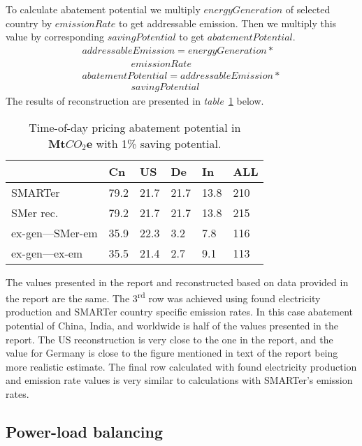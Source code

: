 \documentclass[11pt, twocolumn]{article}
\newcommand{\ts}{\textsuperscript}
\begin{document}
To calculate abatement potential we multiply $energyGeneration$ of selected country by $emissionRate$ to get addressable emission. Then we multiply this value by corresponding $savingPotential$ to get $abatementPotential$.
\begin{gather*}
  addressableEmission = energyGeneration *\\
  \quad\quad\quad\quad\quad emissionRate\\
  abatementPotential = addressableEmission *\\
  \quad\quad\quad\quad\quad savingPotential
\end{gather*}
The results of reconstruction are presented in \emph{table}~\ref{tab:todp} below.
\begin{center}
  \begin{table}[h]
    \begin{tabular}{ p{} | p{} | p{} | p{} | p{} | p{} }
       & Cn & US & De & In & ALL \\
      \hline
      SMARTer & 79.2 & 21.7 & 21.7 & 13.8 & 210 \\
      SMer rec. & 79.2 & 21.7 & 21.7 & 13.8 & 215 \\
      ex-gen---SMer-em & 35.9 & 22.3 & 3.2 & 7.8 & 116 \\
      ex-gen---ex-em & 35.5 & 21.4 & 2.7 & 9.1 & 113
    \end{tabular}
    \caption{Time-of-day pricing abatement potential in $\mathbf{Mt}CO_2\mathbf{e}$ with 1\% saving potential. \label{tab:todp}}
  \end{table}
\end{center}

The values presented in the report and reconstructed based on data provided in the report are the same. The 3\ts{rd} row was achieved using found electricity production and SMARTer country specific emission rates. In this case abatement potential of China, India, and worldwide is half of the values presented in the report. The US reconstruction is very close to the one in the report, and the value for Germany is close to the figure mentioned in text of the report being more realistic estimate. The final row calculated with found electricity production and emission rate values is very similar to calculations with SMARTer's emission rates.


\subsection{Power-load balancing}
\end{document}
